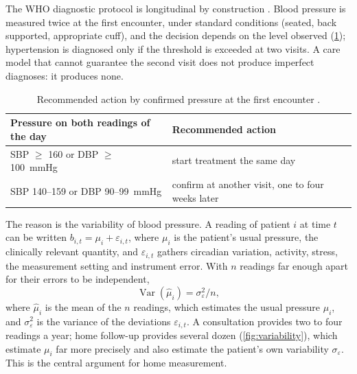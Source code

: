 The WHO diagnostic protocol is longitudinal by construction \parencite{who2023hypertension}. Blood pressure is measured twice at the first encounter, under standard conditions (seated, back supported, appropriate cuff), and the decision depends on the level observed (\cref{tab:protocol}); hypertension is diagnosed only if the threshold is exceeded at two visits. A care model that cannot guarantee the second visit does not produce imperfect diagnoses: it produces none.

\begin{table}[htbp]
\centering\small
\caption{Recommended action by confirmed pressure at the first encounter \parencite{who2023hypertension}.}\label{tab:protocol}
\begin{tabularx}{\textwidth}{@{}>{\raggedright\arraybackslash}p{6.2cm} X@{}}
\toprule
\textbf{Pressure on both readings of the day} & \textbf{Recommended action} \\
\midrule
SBP $\geq$ 160 or DBP $\geq$ 100~mmHg & start treatment the same day \\
SBP 140--159 or DBP 90--99~mmHg & confirm at another visit, one to four weeks later \\
\bottomrule
\end{tabularx}
\end{table}

The reason is the variability of blood pressure. A reading of patient $i$ at time $t$ can be written $b_{i,t} = \mu_i + \varepsilon_{i,t}$, where $\mu_i$ is the patient's usual pressure, the clinically relevant quantity, and $\varepsilon_{i,t}$ gathers circadian variation, activity, stress, the measurement setting and instrument error. With $n$ readings far enough apart for their errors to be independent,
\begin{equation}
  \operatorname{Var}(\hat\mu_i) = \sigma_\varepsilon^2 / n ,
\end{equation}
where $\hat\mu_i$ is the mean of the $n$ readings, which estimates the usual pressure $\mu_i$, and $\sigma_\varepsilon^2$ is the variance of the deviations $\varepsilon_{i,t}$. A consultation provides two to four readings a year; home follow-up provides several dozen (\cref{fig:variability}), which estimate $\mu_i$ far more precisely and also estimate the patient's own variability $\sigma_\varepsilon$. This is the central argument for home measurement.

